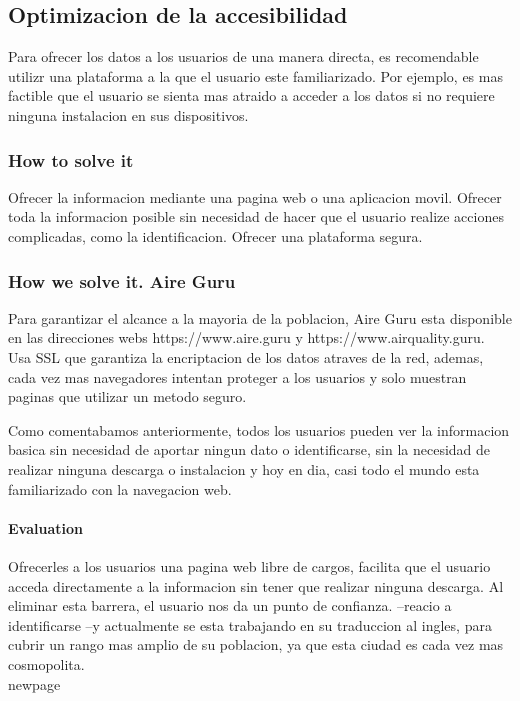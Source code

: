 \subsection{Optimizacion de la accesibilidad}

Para ofrecer los datos a los usuarios de una manera directa, es recomendable utilizr una plataforma a la que el usuario
este familiarizado. Por ejemplo, es mas factible que el usuario se sienta mas atraido a acceder a los datos si no requiere
ninguna instalacion en sus dispositivos.\\


\subsubsection{How to solve it} 
Ofrecer la informacion mediante una pagina web o una aplicacion movil. Ofrecer toda la informacion posible sin necesidad de
hacer que el usuario realize acciones complicadas, como la identificacion.
Ofrecer una plataforma segura.

\subsubsection{How we solve it. Aire Guru} 

Para garantizar el alcance a la mayoria de la poblacion, Aire Guru esta disponible en las direcciones webs https://www.aire.guru y https://www.airquality.guru.
Usa SSL que garantiza la encriptacion de los datos atraves de la red, ademas, cada vez mas navegadores intentan proteger a los usuarios y
solo muestran paginas que utilizar un metodo seguro. 

Como comentabamos anteriormente, todos los usuarios pueden ver la informacion basica sin necesidad de aportar ningun dato o identificarse, sin la necesidad de 
realizar ninguna descarga o instalacion y hoy en dia, casi todo el mundo esta familiarizado con la navegacion web.

\paragraph{Evaluation} \mbox{} 

Ofrecerles a los usuarios una pagina web libre de cargos, facilita que el usuario acceda directamente a la informacion
sin tener que realizar ninguna descarga. Al eliminar esta barrera, el usuario nos da un punto de confianza.
--reacio a identificarse
--y actualmente se esta trabajando en su traduccion al ingles, para cubrir un rango mas amplio de su poblacion, ya que esta ciudad es cada vez mas cosmopolita.
\\newpage